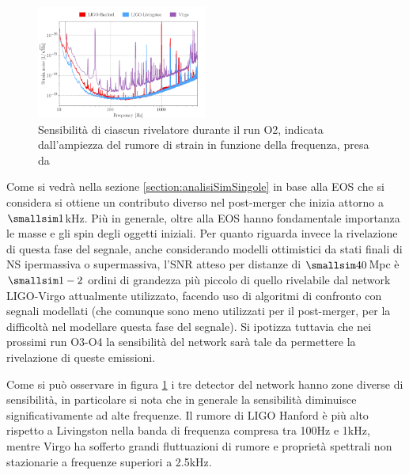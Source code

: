 \begin{figure}
	\vspace{-15pt}
	\begin{center}
		\includegraphics[width=0.5\textwidth]{figures/Capitolo_2/noiseData.png}
	\end{center}
	\vspace{-10pt}
	\caption{Sensibilità di ciascun rivelatore durante il run O2, indicata dall'ampiezza del rumore di strain in funzione della frequenza, presa da \cite{Abbott_2019}}
	\label{fig:NoiseFrequenze}
	\vspace{-10pt}
\end{figure}

Come si vedrà nella sezione \ref{section:analisiSimSingole} in base alla EOS che si considera si ottiene un contributo diverso nel post-merger che inizia attorno a $\smallsim1$kHz. Più in generale, oltre alla EOS hanno fondamentale importanza le masse e gli spin degli oggetti iniziali. 
Per quanto riguarda invece la rivelazione di questa fase del segnale, anche considerando modelli ottimistici da stati finali di NS ipermassiva o supermassiva, l'SNR atteso per distanze di $\smallsim40$Mpc è $\smallsim1-2$ ordini di grandezza più piccolo di quello rivelabile dal network LIGO-Virgo attualmente utilizzato, facendo uso di algoritmi di confronto con segnali modellati (che comunque sono meno utilizzati per il post-merger, per la difficoltà nel modellare questa fase del segnale).
Si ipotizza tuttavia che nei prossimi run O3-O4 la sensibilità del network sarà tale da permettere la rivelazione di queste emissioni.

Come si può osservare in figura \ref{fig:NoiseFrequenze} i tre detector del network hanno zone diverse di sensibilità, in particolare si nota che in generale la sensibilità diminuisce significativamente ad alte frequenze. Il rumore di LIGO Hanford è più alto rispetto a Livingston nella banda di frequenza compresa tra 100Hz e 1kHz, mentre Virgo ha sofferto grandi fluttuazioni di rumore e proprietà spettrali non stazionarie a frequenze superiori a 2.5kHz.

